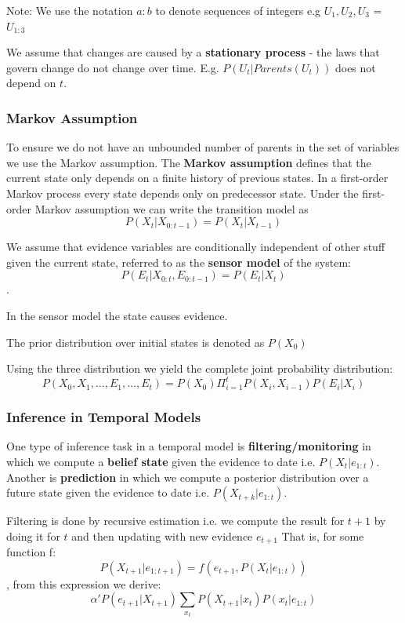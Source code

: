 \documentclass{article}
\begin{document}
Note: We use the notation $a:b$ to denote sequences of integers e.g $U_1, U_2, U_3$ = $U_{1:3}$

We assume that changes are caused by a \textbf{stationary process} - the laws that govern change do not change over time. E.g. $P(U_t | Parents(U_t))$ does not depend on $t$. 

\subsubsection{Markov Assumption}

To ensure we do not have an unbounded number of parents in the set of variables we use the Markov assumption. The \textbf{Markov assumption} defines that the current state only depends on a finite history of previous states. In a first-order Markov process every state depends only on predecessor state. Under the first-order Markov assumption we can write the transition model as $$P(X_t | X_{0:t-1}) = P(X_t | X_{t-1})$$

We assume that evidence variables are conditionally independent of other stuff given the current state, referred to as the \textbf{sensor model} of the system: $$P(E_t | X_{0:t}, E_{0:t-1}) = P(E_t | X_t)$$. 

In the sensor model the state causes evidence. \newline

The prior distribution over initial states is denoted as $P(X_0)$ \newline

Using the three distribution we yield the complete joint probability distribution: $$P(X_0, X_1, \ldots, E_1, \ldots, E_t) = P(X_0)\Pi_{i=1}^t P(X_i, X_{i-1})P(E_i | X_i)$$ \newline

\subsubsection{Inference in Temporal Models}

One type of inference task in a temporal model is \textbf{filtering/monitoring} in which we compute a \textbf{belief state} given the evidence to date i.e. $P(X_t | e_{1:t})$. 
Another is \textbf{prediction} in which we compute a posterior distribution over a future state given the evidence to date i.e. $P(X_{t+k} | e_{1:t})$. \newline

Filtering is done by recursive estimation i.e. we compute the result for $t+1$ by doing it for $t$ and then updating with new evidence $e_{t+1}$ That is, for some function f: $$P(X_{t+1} | e_{1:t+1}) = f(e_{t+1}, P(X_t | e_{1:t}))$$, from this expression we derive: $$\alpha' P(e_{t+1} | X_{t+1})\sum_{x_t} P(X_{t+1} | x_t) P(x_t | e_{1:t})$$
\end{document}
